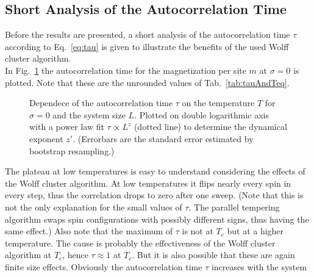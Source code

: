 \subsection{Short Analysis of the Autocorrelation Time}
\label{ssec:results:autocorr}
    Before the results are presented, a short analysis of the
    autocorrelation time \(\tau\) according to Eq.\ \ref{eq:tau} is given to
    illustrate the benefits of the used Wolff cluster algorithm.\\
    In Fig.\ \ref{fig:autocorr}
    the autocorrelation time for the magnetization per site \(m\) at
    \(\sigma=0\) is plotted. Note that these are the unrounded values
    of Tab.\ \ref{tab:tauAndTeq}.
    \begin{figure}[htbp]
        \centering
        \caption[The Autocorrelation Time $\tau$]
        {
            Dependece of the autocorrelation time $\tau$ on
             the temperature $T$ for
                $\sigma=0$ and
             the system size $L$. Plotted on
                double logarithmic axis with a power law fit \(\tau \propto L^z\) (dotted line)
                to determine the dynamical exponent \(z'\).
                (Errorbars are the standard error estimated by bootstrap resampling.)
        }
        \label{fig:autocorr}
    \end{figure}
    The plateau at low temperatures is easy to understand considering the
    effects of the Wolff cluster algorithm. At low temperatures it flips nearly every
    spin in every step, thus the correlation drops to zero after one sweep.
    (Note that this is not the only explanation for the small values of \(\tau\).
    The parallel tempering algorithm swaps spin configurations
    with possibly different signs, thus having the same effect.)
    Also note that the maximum of \(\tau\) is not at \(T_c\) but at a higher
    temperature. The cause is probably the effectiveness of the Wolff cluster
    algorithm at \(T_c\), hence \(\tau \approx 1\) at \(T_{c}\).
    But it is also possible that these are again finite size effects.
    Obviously the autocorrelation time \(\tau\) increases with the system
